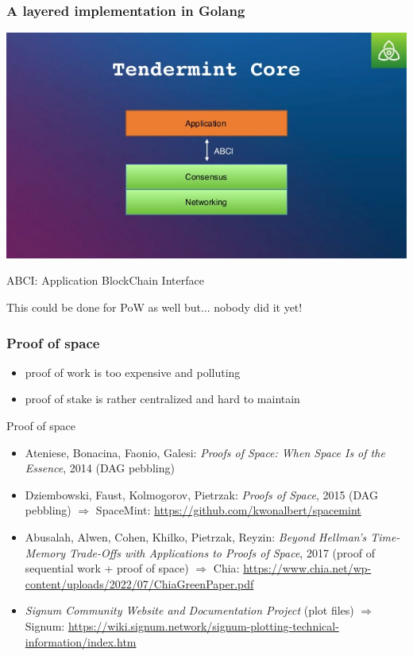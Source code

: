 \documentclass[11pt]{beamer}  %
\begin{document}
\begin{frame}\frametitle{A layered implementation in Golang}

  \begin{center}
    \includegraphics[scale=.38,clip=false]{pictures/tendermint-core.jpg}
  \end{center}

  \smallskip

  ABCI: Application BlockChain Interface

  \smallskip

  This could be done for PoW as well but... nobody did it yet!
  
\end{frame}

\begin{frame}\frametitle{Proof of space}

  \begin{itemize}
  \item proof of work is too expensive and polluting
  \item proof of stake is rather centralized and hard to maintain
  \end{itemize}

  \bigskip

  \begin{greenbox}{Proof of space}
    \begin{itemize}
    \item Ateniese, Bonacina, Faonio, Galesi: \emph{Proofs of Space: When Space Is of the Essence}, 2014 (DAG pebbling)
    \item Dziembowski, Faust, Kolmogorov, Pietrzak: \emph{Proofs of Space}, 2015 (DAG pebbling) $\Rightarrow$
      {\color{red}SpaceMint}: \url{https://github.com/kwonalbert/spacemint}
    \item Abusalah, Alwen, Cohen, Khilko, Pietrzak, Reyzin: \emph{Beyond Hellman's Time-Memory Trade-Offs with Applications to Proofs of Space}, 2017 (proof of sequential work + proof of space) $\Rightarrow$ {\color{red}Chia}: \url{https://www.chia.net/wp-content/uploads/2022/07/ChiaGreenPaper.pdf}
    \item \emph{Signum Community Website and Documentation Project} (plot files) $\Rightarrow$ {\color{red}Signum}: \url{https://wiki.signum.network/signum-plotting-technical-information/index.htm}
    \end{itemize}
  \end{greenbox}
  
\end{frame}
\end{document}
